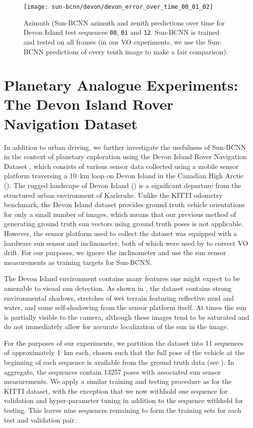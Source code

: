 \begin{figure}
    \centering
    \texttt{[image: sun-bcnn/devon/devon\_error\_over\_time\_00\_01\_02]}
    \caption{Azimuth (Sun-BCNN azimuth and zenith predictions over time for Devon Island test sequences \texttt{00}, \texttt{01} and \texttt{12}. Sun-BCNN is trained and tested on all frames (in our VO experiments, we use the Sun-BCNN predictions of every tenth image to make a fair comparison). }
    \label{fig:sun-bcnn_devon_error_over_time}
\end{figure}

\section{Planetary Analogue Experiments: The Devon Island Rover Navigation Dataset}
In addition to urban driving, we further investigate the usefulness of Sun-BCNN in the context of planetary exploration using the Devon Island Rover Navigation Dataset \citep{Furgale2012-kk}, which consists of various sensor data collected using a mobile sensor platform traversing a 10~km loop on Devon Island in the Canadian High Arctic ().
The rugged landscape of Devon Island () is a significant departure from the structured urban environment of Karlsruhe.
Unlike the KITTI odometry benchmark, the Devon Island dataset provides ground truth vehicle orientations for only a small number of images, which means that our previous method of generating ground truth sun vectors using ground truth poses is not applicable.
However, the sensor platform used to collect the dataset was equipped with a hardware sun sensor and inclinometer, both of which were used by \citet{Lambert2012-um} to correct VO drift.
For our purposes, we ignore the inclinometer and use the sun sensor measurements as training targets for Sun-BCNN.

The Devon Island environment contains many features one might expect to be amenable to visual sun detection.
As shown in , the dataset contains strong environmental shadows, stretches of wet terrain featuring reflective mud and water, and some self-shadowing from the sensor platform itself.
At times the sun is partially visible to the camera, although these images tend to be saturated and do not immediately allow for accurate localization of the sun in the image.

For the purposes of our experiments, we partition the dataset into 11 sequences of approximately 1~km each, chosen such that the full pose of the vehicle at the beginning of each sequence is available from the ground truth data (see ). In aggregate, the sequences contain 13257 poses with associated sun sensor measurements.
We apply a similar training and testing procedure as for the KITTI dataset, with the exception that we now withhold one sequence for validation and hyper-parameter tuning in addition to the sequence withheld for testing.
This leaves nine sequences remaining to form the training sets for each test and validation pair.

